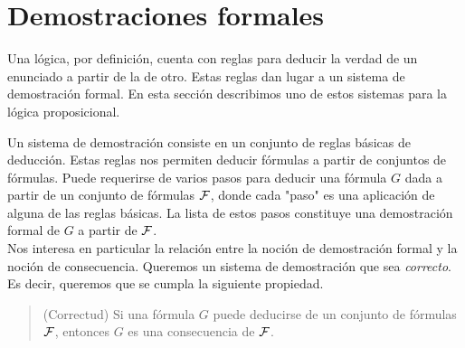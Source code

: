 \documentclass[12pt,a4paper]{book}
\newcommand{\comillas}[1]{"#1"}
\begin{document}
    \section{Demostraciones formales}

    Una lógica, por definición, cuenta con reglas para deducir la verdad de un enunciado a partir de la de otro. Estas reglas
    dan lugar a un sistema de demostración formal. En esta sección describimos uno de estos sistemas para la lógica proposicional.

    Un sistema de demostración consiste en un conjunto de reglas básicas de deducción. Estas reglas nos permiten deducir
    fórmulas a partir de conjuntos de fórmulas. Puede requerirse de varios pasos para deducir una fórmula $G$ dada a partir de un
    conjunto de fórmulas $\mathcal{F}$, donde cada \comillas{paso} es una aplicación de alguna de las reglas básicas. La lista de estos pasos
    constituye una demostración formal de $G$ a partir de $\mathcal{F}$.\\
    Nos interesa en particular la relación entre la noción de demostración formal y la noción de consecuencia. Queremos un
    sistema de demostración que sea \textit{correcto}. Es decir, queremos que se cumpla la siguiente propiedad.

    \begin{quote}
        (Correctud) Si una fórmula $G$ puede deducirse de un conjunto de fórmulas $\mathcal{F}$, entonces $G$ es una consecuencia de $\mathcal{F}$.
    \end{quote}
\end{document}
